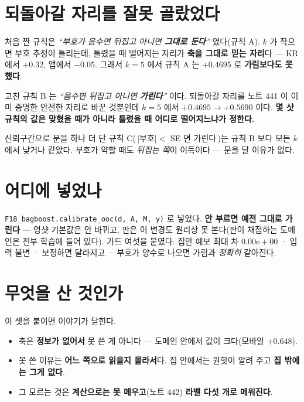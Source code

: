 \documentclass[11pt]{article}
\begin{document}
\section{되돌아갈 자리를 잘못 골랐었다}

처음 짠 규칙은 \emph{``부호가 음수면 뒤집고 아니면 \textbf{그대로 둔다}''}
였다(규칙 A). $k$ 가 작으면 부호 추정이 틀리는데, 틀렸을 때 떨어지는
자리가 \textbf{축을 그대로 믿는 자리}다 --- KR 에서 $+0.32$, 앱에서
$-0.05$. 그래서 $k{=}5$ 에서 규칙 A 는 $+0.4695$ 로 \textbf{가림보다도
못했다}.

고친 규칙 B 는 \emph{``음수면 뒤집고 아니면 \textbf{가린다}''} 이다. 되돌아갈
자리를 노트 441 이 이미 증명한 안전한 자리로 바꾼 것뿐인데 $k{=}5$ 에서
$+0.4695 \to \mathbf{+0.5690}$ 이다. \textbf{몇 샷 규칙의 값은 맞혔을 때가
아니라 틀렸을 때 어디로 떨어지느냐가 정한다.}

신뢰구간으로 문을 하나 더 단 규칙 C(\,$|$부호$| <$ SE 면 가린다\,)는 규칙 B
보다 모든 $k$ 에서 낮거나 같았다. 부호가 약할 때도 \emph{뒤집는 쪽}이
이득이다 --- 문을 달 이유가 없다.

\section{어디에 넣었나}

\texttt{F18\_bagboost.calibrate\_ooc(d, A, M, y)} 로 넣었다. \textbf{안
부르면 예전 그대로 가린다} --- 영샷 기본값은 안 바뀌고, 판은 이 변경도
원리상 못 본다(판이 채점하는 도메인은 전부 학습에 들어 있다). 가드 여섯을
붙였다: 집안 예보 최대 차 $0.00\mathrm{e}{+}00$ · 입력 불변 · 보정하면
달라지고 · 부호가 양수로 나오면 가림과 \emph{정확히} 같아진다.

\section{무엇을 산 것인가}

이 셋을 붙이면 이야기가 닫힌다.

\begin{itemize}
\item 축은 \textbf{정보가 없어서} 못 쓴 게 아니다 --- 도메인 안에서 값이
크다(모바일 $+0.648$).
\item 못 쓴 이유는 \textbf{어느 쪽으로 읽을지 몰라서}다. 집 안에서는
원핫이 알려 주고 \textbf{집 밖에는 그게 없다}.
\item 그 모르는 것은 \textbf{계산으로는 못 메우고}(노트 442) \textbf{라벨
다섯 개로 메워진다}.
\end{itemize}
\end{document}
